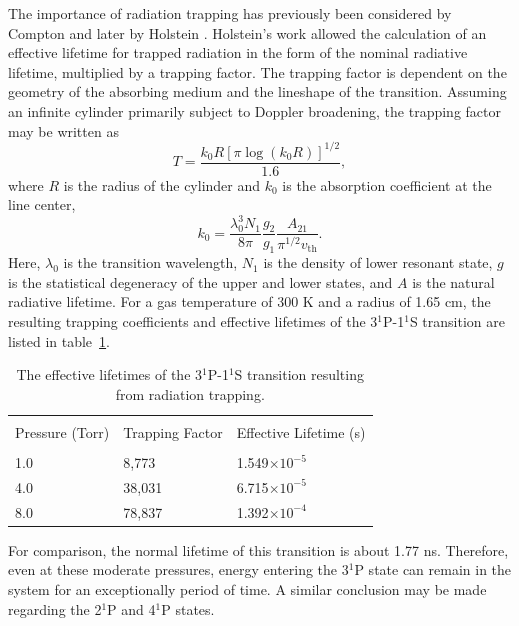 The importance of radiation trapping has previously been considered by Compton
\cite{Compton1922} and later by Holstein \cite{Holstein1947, Holstein1951}.
Holstein's work allowed the calculation of an effective lifetime for trapped
radiation in the form of the nominal radiative lifetime, multiplied by a
trapping factor. The trapping factor is dependent on the geometry of the
absorbing medium and the lineshape of the transition. Assuming an infinite
cylinder primarily subject to Doppler broadening, the trapping factor may be
written as
\begin{equation}
  T = \frac{k_0R\left[\pi\log(k_0R)\right]^{1/2}}{1.6},
\end{equation}
where $R$ is the radius of the cylinder and $k_0$ is the absorption coefficient
at the line center,
\begin{equation}
  k_0 = \frac{\lambda_0^3N_1}{8\pi} \frac{g_2}{g_1}
        \frac{A_{21}}{\pi^{1/2}v_\mathrm{th}}.
\end{equation}
Here, $\lambda_0$ is the transition wavelength, $N_1$ is the density of lower
resonant state, $g$ is the statistical degeneracy of the upper and lower states,
and $A$ is the natural radiative lifetime. For a gas temperature of 300 K and a
radius of 1.65 cm, the resulting trapping coefficients and effective lifetimes
of the 3$^1$P-1$^1$S transition are listed in table~\ref{tbl:lifetimes}.
\begin{table}
  \centering
  \caption{The effective lifetimes of the 3$^1$P-1$^1$S transition resulting
    from radiation trapping.}
  \label{tbl:lifetimes}
  \begin{tabular}{lll}
    \toprule \\
    Pressure (Torr) & Trapping Factor & Effective Lifetime (s) \\
    \midrule \\
    1.0             & 8,773            & 1.549$\times10^{-5}$   \\
    4.0             & 38,031           & 6.715$\times10^{-5}$   \\
    8.0             & 78,837           & 1.392$\times10^{-4}$   \\
    \bottomrule
  \end{tabular}
\end{table}
For comparison, the normal lifetime of this transition is about 1.77 ns.
Therefore, even at these moderate pressures, energy entering the 3$^1$P state
can remain in the system for an exceptionally period of time. A similar
conclusion may be made regarding the 2$^1$P and 4$^1$P states.

